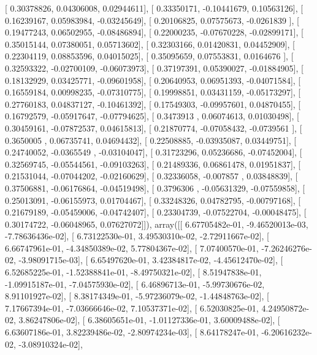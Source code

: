 \documentclass{article}
\begin{document}
       [ 0.30378826,  0.04306008,  0.02944611],
       [ 0.33350171, -0.10441679,  0.10563126],
       [ 0.16239167,  0.05983984, -0.03245649],
       [ 0.20106825,  0.07575673, -0.0261839 ],
       [ 0.19477243,  0.06502955, -0.08486894],
       [ 0.22000235, -0.07670228, -0.02899171],
       [ 0.35015144,  0.07380051,  0.05713602],
       [ 0.32303166,  0.01420831,  0.04452909],
       [ 0.22304119,  0.08853596,  0.04015025],
       [ 0.35095659,  0.07553831,  0.0164676 ],
       [ 0.32593322, -0.02700109, -0.06073973],
       [ 0.37197391,  0.05390027, -0.01884905],
       [ 0.18132929,  0.03425771, -0.09601958],
       [ 0.20640953,  0.06951393, -0.04071584],
       [ 0.16559184,  0.00998235, -0.07310775],
       [ 0.19998851,  0.03431159, -0.05173297],
       [ 0.27760183,  0.04837127, -0.10461392],
       [ 0.17549303, -0.09957601,  0.04870455],
       [ 0.16792579, -0.05917647, -0.07794625],
       [ 0.3473913 ,  0.06074613,  0.01030498],
       [ 0.30459161, -0.07872537,  0.04615813],
       [ 0.21870774, -0.07058432, -0.0739561 ],
       [ 0.3650005 ,  0.06735741,  0.04694432],
       [ 0.22508885, -0.03935087,  0.03449751],
       [ 0.24740052, -0.0365549 , -0.03104047],
       [ 0.31723296,  0.05236686, -0.07452004],
       [ 0.32569745, -0.05544561, -0.09103263],
       [ 0.21489336,  0.06861478,  0.01951837],
       [ 0.21531044, -0.07044202, -0.02160629],
       [ 0.32336058, -0.007857  ,  0.03848839],
       [ 0.37506881, -0.06176864, -0.04519498],
       [ 0.3796306 , -0.05631329, -0.07559858],
       [ 0.25013091, -0.06155973,  0.01704467],
       [ 0.33248326,  0.04782795, -0.00797168],
       [ 0.21679189, -0.05459006, -0.04742407],
       [ 0.23304739, -0.07522704, -0.00048475],
       [ 0.30174722, -0.06048965,  0.07627072]]), array([[  6.67705482e-01,  -9.46520013e-03,  -7.78636436e-02],
       [  6.73122530e-01,   3.49530310e-02,  -2.72911667e-02],
       [  6.66747961e-01,  -4.34850389e-02,   5.77804367e-02],
       [  7.07400570e-01,  -7.26246276e-02,  -3.98091715e-03],
       [  6.65497620e-01,   3.42384817e-02,  -4.45612470e-02],
       [  6.52685225e-01,  -1.52388841e-01,  -8.49750321e-02],
       [  8.51947838e-01,  -1.09915187e-01,  -7.04575930e-02],
       [  6.46896713e-01,  -5.99730676e-02,   8.91101927e-02],
       [  8.38174349e-01,  -5.97236079e-02,  -1.44848763e-02],
       [  7.17667394e-01,  -7.03666646e-02,   7.10537371e-02],
       [  6.52030825e-01,   4.24950872e-02,   3.86247806e-02],
       [  6.38605651e-01,  -1.01127336e-01,   3.60009488e-02],
       [  6.63607186e-01,   3.82239486e-02,  -2.80974234e-03],
       [  8.64178247e-01,  -6.20616232e-02,  -3.08910324e-02],
\end{document}
